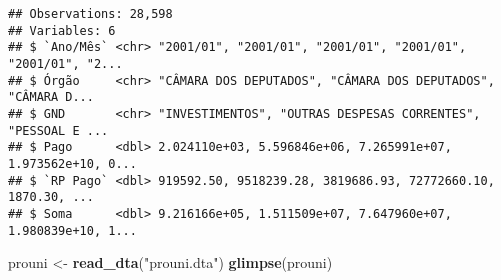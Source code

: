 \documentclass[
]{article}
\newenvironment{Shaded}{\begin{snugshade}}{\end{snugshade}}
\newcommand{\KeywordTok}[1]{\textcolor[rgb]{0.13,0.29,0.53}{\textbf{#1}}}
\newcommand{\NormalTok}[1]{#1}
\newcommand{\StringTok}[1]{\textcolor[rgb]{0.31,0.60,0.02}{#1}}
\begin{document}
\begin{verbatim}
## Observations: 28,598
## Variables: 6
## $ `Ano/Mês` <chr> "2001/01", "2001/01", "2001/01", "2001/01", "2001/01", "2...
## $ Órgão     <chr> "CÂMARA DOS DEPUTADOS", "CÂMARA DOS DEPUTADOS", "CÂMARA D...
## $ GND       <chr> "INVESTIMENTOS", "OUTRAS DESPESAS CORRENTES", "PESSOAL E ...
## $ Pago      <dbl> 2.024110e+03, 5.596846e+06, 7.265991e+07, 1.973562e+10, 0...
## $ `RP Pago` <dbl> 919592.50, 9518239.28, 3819686.93, 72772660.10, 1870.30, ...
## $ Soma      <dbl> 9.216166e+05, 1.511509e+07, 7.647960e+07, 1.980839e+10, 1...
\end{verbatim}

\begin{Shaded}
\begin{Highlighting}[]
\NormalTok{prouni <-}\StringTok{ }\KeywordTok{read_dta}\NormalTok{(}\StringTok{"prouni.dta"}\NormalTok{)}
\KeywordTok{glimpse}\NormalTok{(prouni)}
\end{Highlighting}
\end{Shaded}
\end{document}
